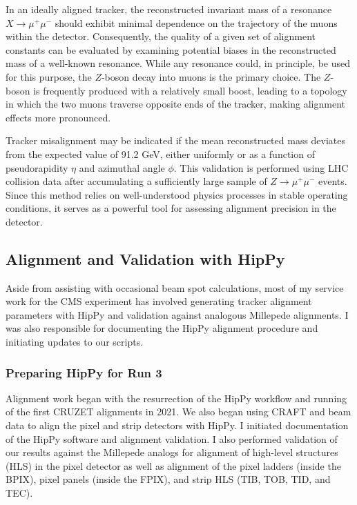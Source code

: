 In an ideally aligned tracker, the reconstructed invariant mass of a resonance \( X \to \mu^+\mu^- \) should exhibit minimal dependence on the trajectory of the muons within the detector. Consequently, the quality of a given set of alignment constants can be evaluated by examining potential biases in the reconstructed mass of a well-known resonance. While any resonance could, in principle, be used for this purpose, the \( Z \)-boson decay into muons is the primary choice. The \( Z \)-boson is frequently produced with a relatively small boost, leading to a topology in which the two muons traverse opposite ends of the tracker, making alignment effects more pronounced.

Tracker misalignment may be indicated if the mean reconstructed mass deviates from the expected value of 91.2 GeV, either uniformly or as a function of pseudorapidity \( \eta \) and azimuthal angle \( \phi \). This validation is performed using LHC collision data after accumulating a sufficiently large sample of \( Z \to \mu^+\mu^- \) events. Since this method relies on well-understood physics processes in stable operating conditions, it serves as a powerful tool for assessing alignment precision in the detector.

\subsection{Alignment and Validation with HipPy} \label{sec:alignment}

Aside from assisting with occasional beam spot calculations, most of my service work for the CMS experiment has involved generating tracker alignment parameters with HipPy and validation against analogous Millepede alignments. I was also responsible for documenting the HipPy alignment procedure and initiating updates to our scripts. 

\subsubsection{Preparing HipPy for Run 3}

Alignment work began with the resurrection of the HipPy workflow and running of the first CRUZET alignments in 2021. We also began using CRAFT and beam data to align the pixel and strip detectors with HipPy. I initiated documentation of the HipPy software and alignment validation. I also performed validation of our results against the Millepede analogs for alignment of high-level structures (HLS) in the pixel detector as well as alignment of the pixel ladders (inside the BPIX), pixel panels (inside the FPIX), and strip HLS (TIB, TOB, TID, and TEC). 

